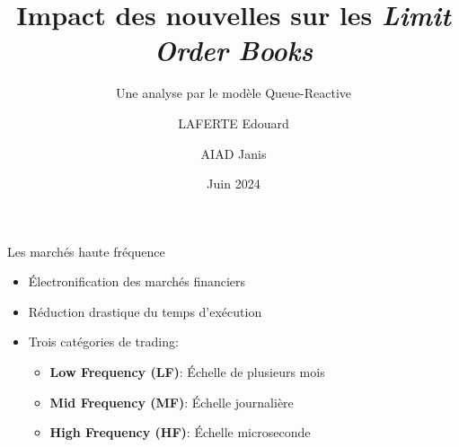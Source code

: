 \documentclass[aspectratio=169]{beamer}  %
\title[Impact des nouvelles sur les LOB]{Impact des nouvelles sur les \textit{Limit Order Books}}
\subtitle{Une analyse par le modèle Queue-Reactive}
\author[LAFERTE \& AIAD]{LAFERTE Edouard \and AIAD Janis}
\institute[École Polytechnique]{
    Département de mathématiques appliquées\\
    École Polytechnique
}
\date{Juin 2024}
\begin{document}
\begin{frame}
    \titlepage
\end{frame}

\begin{frame}{Les marchés haute fréquence}
    \begin{itemize}
        \item Électronification des marchés financiers
        \item Réduction drastique du temps d'exécution
        \item Trois catégories de trading:
        \begin{itemize}
            \item \textbf{Low Frequency (LF)}: Échelle de plusieurs mois
            \item \textbf{Mid Frequency (MF)}: Échelle journalière
            \item \textbf{High Frequency (HF)}: Échelle microseconde
        \end{itemize}
    \end{itemize}
\end{frame}
\end{document}

